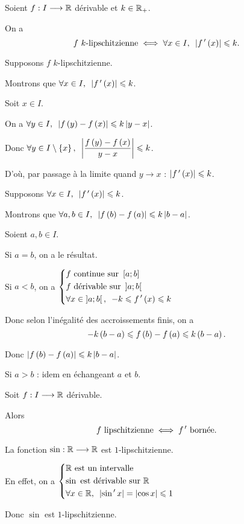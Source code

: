 \begin{cor}
Soient \(f:I\longrightarrow\mathbb{R}\) dérivable et \(k\in\mathbb{R}_+\).

On a \[f\text{ \(k\)-lipschitzienne}\ssi\quantifs{\forall x\in I}\abs{f\prim\paren{x}}\leq k.\]
\end{cor}

\begin{dem}
\impdir

Supposons \(f\) \(k\)-lipschitzienne.

Montrons que \(\quantifs{\forall x\in I}\abs{f\prim\paren{x}}\leq k\).

Soit \(x\in I\).

On a \(\quantifs{\forall y\in I}\abs{f\paren{y}-f\paren{x}}\leq k\abs{y-x}\).

Donc \(\quantifs{\forall y\in I\excluant\accol{x}}\abs{\dfrac{f\paren{y}-f\paren{x}}{y-x}}\leq k\).

D'où, par passage à la limite quand \(y\to x\) : \(\left\lvert f^{\,\prime}\left(x\right)\right\rvert\leqslant k\).

\imprec

Supposons \(\quantifs{\forall x\in I}\abs{f\prim\paren{x}}\leq k\).

Montrons que \(\quantifs{\forall a,b\in I}\abs{f\paren{b}-f\paren{a}}\leq k\abs{b-a}\).

Soient \(a,b\in I\).

Si \(a=b\), on a le résultat.

Si \(a<b\), on a \(\begin{dcases}f\text{ continue sur }\intervii{a}{b} \\ f\text{ dérivable sur }\intervee{a}{b} \\ \quantifs{\forall x\in\intervee{a}{b}}-k\leq f\prim\paren{x}\leq k\end{dcases}\)

Donc selon l'inégalité des accroissements finis, on a \[-k\left(b-a\right)\leqslant f\left(b\right)-f\left(a\right)\leqslant k\left(b-a\right).\]

Donc \(\left\lvert f\left(b\right)-f\left(a\right)\right\rvert\leqslant k\left\lvert b-a\right\rvert\).

Si \(a>b\) : idem en échangeant \(a\) et \(b\).
\end{dem}

\begin{cor}
Soit \(f:I\longrightarrow\mathbb{R}\) dérivable.

Alors \[f\text{ lipschitzienne}\iff f^{\,\prime}\text{ bornée}.\]
\end{cor}

\begin{ex}
La fonction \(\sin:\mathbb{R}\longrightarrow\mathbb{R}\) est \(1\)-lipschitzienne.

En effet, on a \(\begin{dcases}\R\text{ est un intervalle} \\ \sin\text{ est dérivable sur }\R \\ \quantifs{\forall x\in\R}\abs{\sin\prim x}=\abs{\cos x}\leq1\end{dcases}\)

Donc \(\sin\) est \(1\)-lipschitzienne.
\end{ex}

